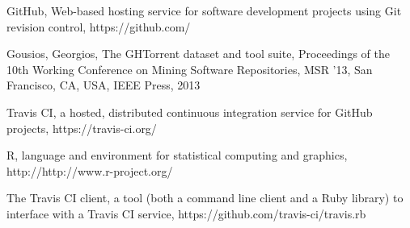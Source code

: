 \documentclass[a4paper,11pt]{article}
\begin{document}
	\begin{thebibliography}{9}
			GitHub, Web-based hosting service for software development projects using Git revision control, https://github.com/

			Gousios, Georgios, The GHTorrent dataset and tool suite, 
			Proceedings of the 10th Working Conference on Mining Software Repositories, MSR '13,
			San Francisco, CA, USA, IEEE Press, 2013

			Travis CI, a hosted, distributed continuous integration service for GitHub projects, https://travis-ci.org/

			R, language and environment for statistical computing and graphics, http://http://www.r-project.org/
			
		  The Travis CI client, a tool (both a command line client and a Ruby library) to interface with a Travis CI service,
		  https://github.com/travis-ci/travis.rb
		
	\end{thebibliography}
\end{document}
